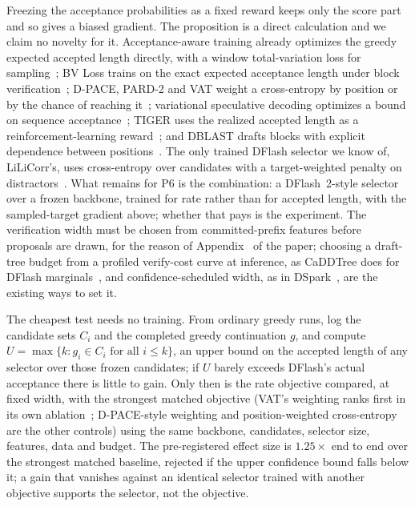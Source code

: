 Freezing the acceptance probabilities as a fixed reward keeps only the score part and so gives a biased gradient. The proposition is a direct calculation and we claim no novelty for it. Acceptance-aware training already optimizes the greedy expected accepted length directly, with a window total-variation loss for sampling~\cite{aadt}; BV Loss trains on the exact expected acceptance length under block verification~\cite{bvloss}; D-PACE, PARD-2 and VAT weight a cross-entropy by position or by the chance of reaching it~\cite{dpace,pard2,vat}; variational speculative decoding optimizes a bound on sequence acceptance~\cite{vsd}; TIGER uses the realized accepted length as a reinforcement-learning reward~\cite{tiger}; and DBLAST drafts blocks with explicit dependence between positions~\cite{dblast}. The only trained DFlash selector we know of, LiLiCorr's, uses cross-entropy over candidates with a target-weighted penalty on distractors~\cite{lilicorr}. What remains for P6 is the combination: a DFlash~2-style selector over a frozen backbone, trained for rate rather than for accepted length, with the sampled-target gradient above; whether that pays is the experiment. The verification width must be chosen from committed-prefix features before proposals are drawn, for the reason of Appendix~ of the paper; choosing a draft-tree budget from a profiled verify-cost curve at inference, as CaDDTree does for DFlash marginals~\cite{caddtree}, and confidence-scheduled width, as in DSpark~\cite{dspark}, are the existing ways to set it.

The cheapest test needs no training. From ordinary greedy runs, log the candidate sets $C_i$ and the completed greedy continuation $g$, and compute $U=\max\{k:g_i\in C_i\text{ for all }i\le k\}$, an upper bound on the accepted length of any selector over those frozen candidates; if $U$ barely exceeds DFlash's actual acceptance there is little to gain. Only then is the rate objective compared, at fixed width, with the strongest matched objective (VAT's weighting ranks first in its own ablation~\cite{vat}; D-PACE-style weighting and position-weighted cross-entropy are the other controls) using the same backbone, candidates, selector size, features, data and budget. The pre-registered effect size is $1.25\times$ end to end over the strongest matched baseline, rejected if the upper confidence bound falls below it; a gain that vanishes against an identical selector trained with another objective supports the selector, not the objective.

